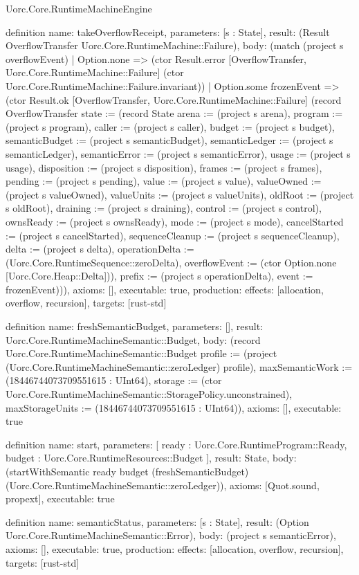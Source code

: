\begin{lexlean}{Uorc.Core.RuntimeMachineEngine}
\begin{semanticmodule}
definition{
  name: takeOverflowReceipt,
  parameters: [s : State],
  result: (Result OverflowTransfer Uorc.Core.RuntimeMachine::Failure),
  body: (match (project s overflowEvent)
    | Option.none => (ctor Result.error [OverflowTransfer, Uorc.Core.RuntimeMachine::Failure] (ctor Uorc.Core.RuntimeMachine::Failure.invariant))
    | Option.some frozenEvent => (ctor Result.ok [OverflowTransfer, Uorc.Core.RuntimeMachine::Failure] (record OverflowTransfer {state := (record State {arena := (project s arena), program := (project s program), caller := (project s caller), budget := (project s budget), semanticBudget := (project s semanticBudget), semanticLedger := (project s semanticLedger), semanticError := (project s semanticError), usage := (project s usage), disposition := (project s disposition), frames := (project s frames), pending := (project s pending), value := (project s value), valueOwned := (project s valueOwned), valueUnits := (project s valueUnits), oldRoot := (project s oldRoot), draining := (project s draining), control := (project s control), ownsReady := (project s ownsReady), mode := (project s mode), cancelStarted := (project s cancelStarted), sequenceCleanup := (project s sequenceCleanup), delta := (project s delta), operationDelta := (Uorc.Core.RuntimeSequence::zeroDelta), overflowEvent := (ctor Option.none [Uorc.Core.Heap::Delta])}), prefix := (project s operationDelta), event := frozenEvent}))),
  axioms: [],
  executable: true,
  production: {effects: [allocation, overflow, recursion], targets: [rust-std]}
}

definition{
  name: freshSemanticBudget,
  parameters: [],
  result: Uorc.Core.RuntimeMachineSemantic::Budget,
  body: (record Uorc.Core.RuntimeMachineSemantic::Budget {profile := (project (Uorc.Core.RuntimeMachineSemantic::zeroLedger) profile), maxSemanticWork := (18446744073709551615 : UInt64), storage := (ctor Uorc.Core.RuntimeMachineSemantic::StoragePolicy.unconstrained), maxStorageUnits := (18446744073709551615 : UInt64)}),
  axioms: [],
  executable: true
}

definition{
  name: start,
  parameters: [
    ready : Uorc.Core.RuntimeProgram::Ready,
    budget : Uorc.Core.RuntimeResources::Budget
  ],
  result: State,
  body: (startWithSemantic ready budget (freshSemanticBudget) (Uorc.Core.RuntimeMachineSemantic::zeroLedger)),
  axioms: [Quot.sound, propext],
  executable: true
}

definition{
  name: semanticStatus,
  parameters: [s : State],
  result: (Option Uorc.Core.RuntimeMachineSemantic::Error),
  body: (project s semanticError),
  axioms: [],
  executable: true,
  production: {effects: [allocation, overflow, recursion], targets: [rust-std]}
}


\end{semanticmodule}
\end{lexlean}
